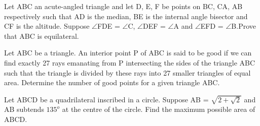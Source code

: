 \item Let ABC an acute-angled triangle and let D, E, F be points on BC, CA, AB respectively such that AD is the median, BE is the internal angle bisector and CF is the altitude. Suppose $\angle$FDE = $\angle$C, $\angle$DEF = $\angle$A and $\angle$EFD = $\angle$B.Prove that ABC is equilateral.

\item Let ABC be a triangle. An interior point P of ABC is said to be good if we can find exactly 27 rays emanating from P intersecting the sides of the triangle ABC such that the triangle is divided by these rays into 27 smaller triangles of equal area. Determine the number of good points for a given triangle ABC.

\item Let ABCD be a quadrilateral inscribed in a circle. Suppose AB = $\sqrt{2 + \sqrt{2}}$ and AB subtends $135^{o}$ at the centre of the circle. Find the maximum possible area of ABCD.

























